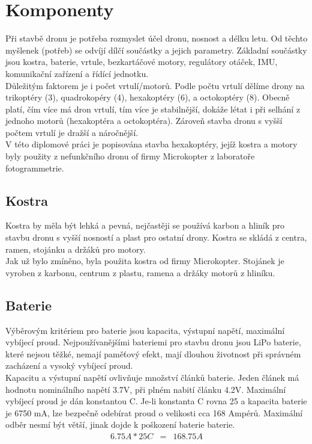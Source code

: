 \chapter{Komponenty}
\label{3-soucastky}

Při stavbě dronu je potřeba rozmyslet účel dronu, nosnost a délku letu. Od těchto myšlenek (potřeb) se odvíjí dílčí součástky a jejich parametry. Základní součástky jsou kostra, baterie, vrtule, bezkartáčové motory, regulátory otáček, IMU, komunikační zařízení a řídící jednotku.\\
Důležitým faktorem je i počet vrtulí/motorů. Podle počtu vrtulí dělíme drony na trikoptéry (3), quadrokopéry (4), hexakoptéry (6), a octokoptéry (8). Obecně platí, čím více má dron vrtulí, tím více je stabilnější, dokáže létat i při selhání z jednoho motorů (hexakoptéra a octokoptéra). Zároveň stavba dronu s vyšší počtem vrtulí je dražší a náročnější.\\
V této diplomové práci je popisována stavba hexakoptéry, jejíž kostra a motory byly použity z nefunkčního dronu of firmy Microkopter z laboratoře fotogrammetrie.\\

\section{Kostra} 
Kostra by měla být lehká a pevná, nejčastěji se používá karbon a hliník pro stavbu dronu s vyšší nosností a plast pro ostatní drony. Kostra se skládá z centra, ramen, stojánku a držáků pro motory.\\
Jak už bylo zmíněno, byla použita kostra od firmy Microkopter. Stojánek je vyroben z karbonu, centrum z plastu, ramena a držáky motorů z hliníku.\\


\section{Baterie} 
Výběrovým kritériem pro baterie jsou kapacita, výstupní napětí, maximální vybíjecí proud.
Nejpoužívanějšími bateriemi pro stavbu dronu jsou LiPo baterie, které nejsou těžké, nemají paměťový efekt, mají dlouhou životnost při správném zacházení a vysoký vybíjecí proud.\\
Kapacitu a výstupní napětí ovlivňuje množství článků baterie. 
Jeden článek má hodnotu nominálního napětí 3.7V, při plném nabití článku 4.2V. Maximální vybíjecí proud je dán konstantou C. Je-li konstanta C rovna 25 a kapacita baterie je 6750 mA, lze bezpečně odebírat proud o velikosti cca 168 Ampérů. Maximální odběr nesmí být větší, jinak dojde k poškození baterie baterie.\\
\begin{eqnarray*} 
	6.75A * 25C & = & 168.75A\\
\end{eqnarray*} 

